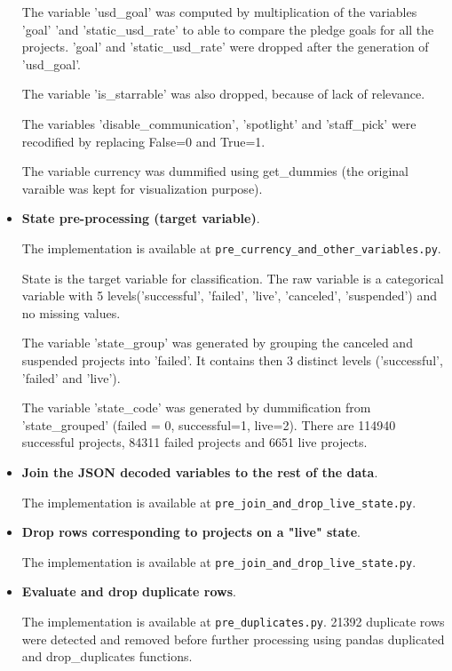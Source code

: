 \documentclass{article}
\begin{document}
\begin{itemize}
    The variable 'usd\_goal' was computed by multiplication of the variables 'goal' 'and 'static\_usd\_rate' to able to compare the pledge goals for all the projects. 'goal' and 'static\_usd\_rate' were dropped after the generation of 'usd\_goal'.
    
    The variable 'is\_starrable' was also dropped, because of lack of relevance.
    
    The variables 'disable\_communication', 'spotlight' and 'staff\_pick' were recodified by replacing False=0 and True=1.
    
    The variable currency was dummified using get\_dummies (the original varaible was kept for visualization purpose).

    \item \textbf{State pre-processing (target variable)}.
    
    The implementation is available at {\tt pre\_currency\_and\_other\_variables.py}.
    
    State is the target variable for classification. The raw variable is a categorical variable with 5 levels('successful', 'failed', 'live', 'canceled', 'suspended') and  no missing values.
    
    The variable 'state\_group' was generated by grouping the canceled and suspended projects into 'failed'. It contains then 3 distinct levels ('successful', 'failed' and 'live').
    
    The variable 'state\_code' was generated by dummification from 'state\_grouped' (failed = 0, successful=1, live=2). There are 114940 successful projects, 84311 failed projects and 6651 live projects.

   \item \textbf{Join the JSON decoded variables to the rest of the data}.
   
   The implementation is available at {\tt pre\_join\_and\_drop\_live\_state.py}.
   
    \item \textbf{Drop rows corresponding to projects on a "live" state}.
    
    The implementation is available at {\tt pre\_join\_and\_drop\_live\_state.py}.
    
    \item \textbf{Evaluate and drop duplicate rows}.
    
    The implementation is available at {\tt pre\_duplicates.py}.
    21392 duplicate rows were detected and removed before further processing using pandas duplicated and drop\_duplicates functions.
    

\end{itemize}
\end{document}

